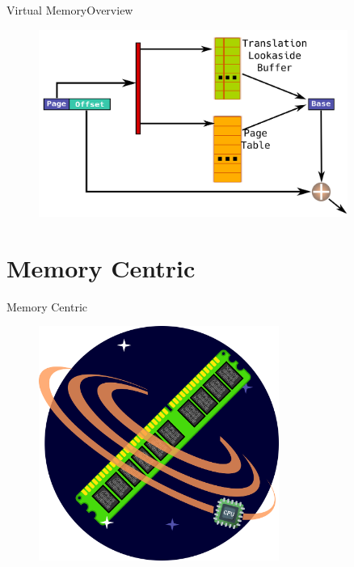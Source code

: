 \documentclass[10pt]{beamer}
\begin{document}
\begin{frame}{Virtual Memory}{Overview}
  \begin{figure}[ht]
    \centering
    \includegraphics[width=0.9\textwidth, keepaspectratio=true]{images/tlb_d.png}
  \end{figure}
\end{frame}

\section{Memory Centric}
\begin{frame}{Memory Centric}{}
  \begin{figure}[ht]
    \centering
    \includegraphics[width=0.7\textwidth, keepaspectratio=true]{images/memory_centric.png}
  \end{figure}
\end{frame}


{\1
\begin{frame}
\end{frame}}
\end{document}
